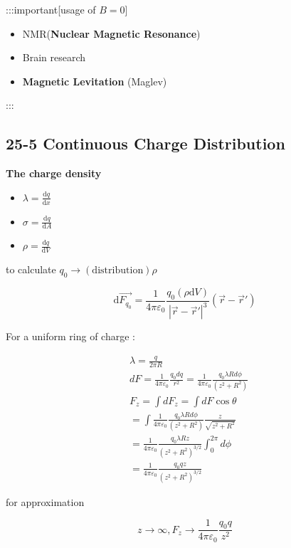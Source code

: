 \documentclass[
]{article}
\providecommand{\tightlist}{%
  \setlength{\itemsep}{0pt}\setlength{\parskip}{0pt}}
\begin{document}
:::important{[}usage of \(B=0\){]}

\begin{itemize}
\tightlist
\item
  NMR(\textbf{Nuclear Magnetic Resonance})
\item
  Brain research
\item
  \textbf{Magnetic Levitation }(Maglev)
\end{itemize}

:::

\hypertarget{continuous-charge-distribution}{%
\subsection{25-5 Continuous Charge
Distribution}\label{continuous-charge-distribution}}

\textbf{The charge density}

\begin{itemize}
\tightlist
\item
  \(\lambda =\frac{\mathrm d q}{\mathrm d x}\)
\item
  \(\sigma =\frac{\mathrm d q}{\mathrm d A}\)
\item
  \(\rho =\frac{\mathrm d q}{\mathrm d V}\)
\end{itemize}

to calculate \(q_0\to (\mathrm{distribution})\rho\)

\[
\mathrm d\vec {F_{q_0}}=\frac{1}{4\pi \varepsilon _0}\frac{q_0(\rho \mathrm d V)}{|\vec r-\vec r'|^3} (\vec r-\vec r')
\]

For a uniform ring of charge :

\[
\begin{aligned}
&\lambda=\frac{q}{2\pi R} \\
&dF=\frac{1}{4\pi\varepsilon_{0}}\frac{q_{0}dq}{r^{2}}=\frac{1}{4\pi\varepsilon_{0}}\frac{q_{0}\lambda Rd\phi}{(z^{2}+R^{2})} \\
&F_{z}=\int dF_{z}=\int dF\cos\theta \\
&=\int\frac1{4\pi\varepsilon_0}\frac{q_0\lambda Rd\phi}{(z^2+R^2)}\frac z{\sqrt{z^2+R^2}} \\
&=\frac1{4\pi\varepsilon_0}\frac{q_0\lambda Rz}{\left(z^2+R^2\right)^{3/2}}\int_0^{2\pi}d\phi \\
&=\frac1{4\pi\varepsilon_0}\frac{q_0qz}{\left(z^2+R^2\right)^{3/2}}
\end{aligned}
\]

for approximation

\[
z\to \infty ,F_z\to \frac{1}{4\pi \varepsilon _0}\frac{q_0q}{z^2}
\]
\end{document}
